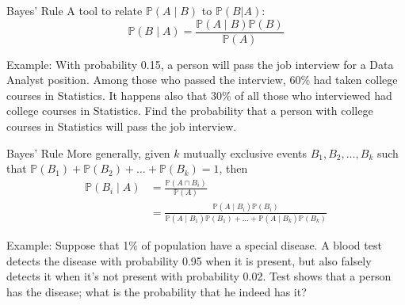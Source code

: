 \documentclass{beamer}
\newcommand{\ignore}[1]{}
\newcommand{\pr}{\mathbb{P}}
\begin{document}
\begin{frame}{Bayes' Rule}
    A tool to relate $\pr(A\mid B)$ to $\pr(B | A)$:
    $$ \pr(B\mid A) = \frac{\pr(A\mid B) \pr(B)}{\pr(A)}$$%

Example: With probability 0.15, a person will pass the job interview for a Data Analyst position. 
Among those who passed the interview, 60\% had taken college courses in Statistics. It
happens also that 30\% of all those who interviewed had college courses in
Statistics. Find the probability that a person with college courses in Statistics
will pass the job interview.
\end{frame}

\begin{frame}{Bayes' Rule}
    More generally, given $k$ mutually exclusive events $B_1,B_2,\dots,B_k$ such that $\pr(B_1) + \pr(B_2) + \dots + \pr(B_k)=1$, then
    \begin{align*}
        \pr(B_i \mid A) & = \frac{\pr(A \cap  B_i) }{\pr(A)}\\
                        & =
        \frac{\pr(A\mid B_i) \pr(B_i)}
        {\pr(A\mid B_1)\pr(B_1) + \dots + \pr(A\mid B_k) \pr(B_k)}
    \end{align*}

    Example: Suppose that 1\% of population have a special disease. A blood test detects the disease with probability 0.95 when it is present, 
    but also falsely detects it when it's not present with probability 0.02. Test shows that a person has the disease; what is the probability that he indeed has it?
\end{frame}


\ignore{
\begin{frame}{General Approach to Probability Problems}
    General steps to computing the probability of an event:
    \begin{itemize}
        \item    Define the random experiment.
        \item    List the sample points of the experiment (i.e.\, identify the sample space).
        \item    Assign probabilities to the sample points.
        \item    Determine the set of sample points contained in the event of interest.
        \item    Sum the probabilities of the sample points in the event to get the probability.
    \end{itemize}
\end{frame}
}
\end{document}
